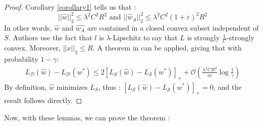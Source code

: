 \documentclass{article}
\begin{document}
    \begin{proof}
        Corollary \ref{corollary1} tells us that :
        \[
            ||\hat{w}||_2^2 
            \leq \lambda^2 C^2 R^2 \text{ and }
            ||\hat{w}_A||_2^2 
            \leq \lambda^2 C^2 (1+\varepsilon)^2 R^2
        \]
        In other words, $\hat{w}$ and $\hat{w_A}$ are contained 
        in a closed convex subset independent of $S$. Authors use the 
        fact that $l$ is $\lambda$-Lipschitz to say that $L$ is strongly 
        $\frac{1}{C}$-strongly convex. Moreover, $||x||_2 \leq R$. 
        A theorem in \cite{NIPS2008_3400} can be applied, giving that
        with probability $1-\gamma$:
        \begin{align*}
            L_{\mathcal{D}}(\hat{w}) - L_{\mathcal{D}}(w^*) 
            \leq 2 [L_{\mathcal{S}}(\hat{w}) - L_{\mathcal{S}}(w^*)]_+ 
            + \mathcal{O}\left( \frac{\lambda^2C R^2}{m} \log \frac{1}{\gamma}  \right)
        \end{align*} 
        By definition, $\hat{w}$ minimizes $L_S$, thus :
        $[L_{\mathcal{S}}(\hat{w}) - L_{\mathcal{S}}(w^*)]_+  = 0$, and the result follows 
        directly. 
    \end{proof}
Now, with these lemmas, we can prove the theorem :
\end{document}

